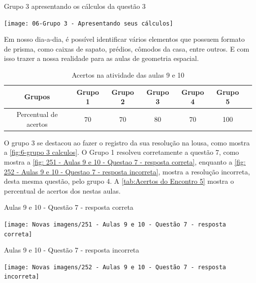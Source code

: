 \begin{CenteredFigure}
    \caption{Grupo 3 apresentando os cálculos da questão 3} \label{fig:6-grupo 3 calculos}
    \texttt{[image: 06-Grupo 3 - Apresentando seus cálculos]}
    \legend{\autoria}
\end{CenteredFigure}

Em nosso dia-a-dia, é possível identificar vários elementos que possuem formato de prisma, como caixas de sapato, prédios, cômodos da casa, entre outros. E com isso trazer a nossa realidade para as aulas de geometria espacial.

\begin{table}[htbp] \centering
    \caption{Acertos na atividade das aulas 9 e 10} \label{tab:Acertos do Encontro 5}
    \begin{tabular}{|c|c|c|c|c|c|c|}
        \hline
        \textbf{Grupos}       & \textbf{Grupo 1} & \textbf{Grupo 2} & \textbf{Grupo 3} & \textbf{Grupo 4} & \textbf{Grupo 5} \\
        \hline
        Percentual de acertos & 70               & 70               & 80               & 70               & 100              \\
        \hline
    \end{tabular}
    \legend{\legendaTabela}
\end{table}

O grupo 3 se destacou ao fazer o registro da sua resolução na lousa, como mostra a \autoref{fig:6-grupo 3 calculos}. O Grupo 1 resolveu corretamente a questão 7, como mostra a \autoref{fig: 251 - Aulas 9 e 10 - Questao 7 - resposta correta}, enquanto a \autoref{fig: 252 - Aulas 9 e 10 - Questao 7 - resposta incorreta}, mostra a resolução incorreta, desta mesma questão, pelo grupo 4. A \autoref{tab:Acertos do Encontro 5} mostra o percentual de acertos dos nestas aulas.

\begin{CenteredFigure}
    \caption{Aulas 9 e 10 - Questão 7 - resposta correta} \label{fig: 251 - Aulas 9 e 10 - Questao 7 - resposta correta}
    \texttt{[image: Novas imagens/251 - Aulas 9 e 10 - Questão 7 - resposta correta]}
    \legend{\autoria}
\end{CenteredFigure}

\begin{CenteredFigure}
    \caption{Aulas 9 e 10 - Questão 7 - resposta incorreta} \label{fig: 252 - Aulas 9 e 10 - Questao 7 - resposta incorreta}
    \texttt{[image: Novas imagens/252 - Aulas 9 e 10 - Questão 7 - resposta incorreta]}
    \legend{\autoria}
\end{CenteredFigure}

